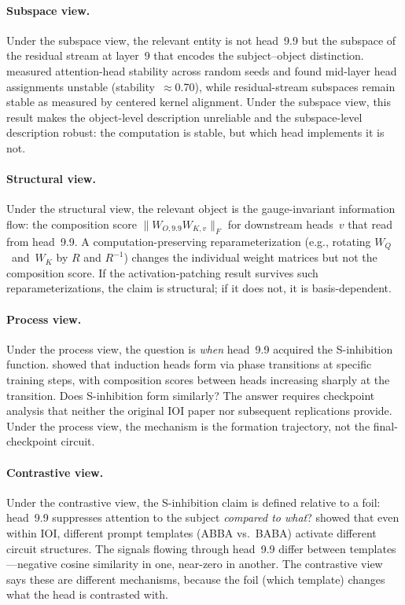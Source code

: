 \documentclass{article}
\begin{document}
\paragraph{Subspace view.}
Under the subspace view, the relevant entity is not head~9.9 but the
subspace of the residual stream at layer~9 that encodes the
subject--object distinction.  \citet{bali2026} measured attention-head
stability across random seeds and found mid-layer head assignments
unstable (stability~$\approx$0.70), while residual-stream subspaces
remain stable as measured by centered kernel alignment.
Under the subspace view, this result makes the object-level description
unreliable and the subspace-level description robust: the computation
is stable, but which head implements it is not.

\paragraph{Structural view.}
Under the structural view, the relevant object is the gauge-invariant
information flow: the composition score $\|W_{O,\text{9.9}} W_{K,v}\|_F$
for downstream heads~$v$ that read from head~9.9.
A computation-preserving reparameterization (e.g., rotating
$W_Q$~and~$W_K$ by $R$ and $R^{-1}$) changes the individual weight
matrices but not the composition score.  If the activation-patching
result survives such reparameterizations, the claim is structural;
if it does not, it is basis-dependent.

\paragraph{Process view.}
Under the process view, the question is \emph{when} head~9.9 acquired
the S-inhibition function.  \citet{olsson2022} showed that induction
heads form via phase transitions at specific training steps, with
composition scores between heads increasing sharply at the transition.
Does S-inhibition form similarly?  The answer requires checkpoint
analysis that neither the original IOI paper nor subsequent
replications provide.  Under the process view, the mechanism is
the formation trajectory, not the final-checkpoint circuit.

\paragraph{Contrastive view.}
Under the contrastive view, the S-inhibition claim is defined relative
to a foil: head~9.9 suppresses attention to the subject
\emph{compared to what}?  \citet{franco2026} showed that even within
IOI, different prompt templates (ABBA vs.\ BABA) activate different
circuit structures.  The signals flowing through head~9.9 differ between
templates---negative cosine similarity in one, near-zero in another.
The contrastive view says these are different mechanisms, because the
foil (which template) changes what the head is contrasted with.
\end{document}
